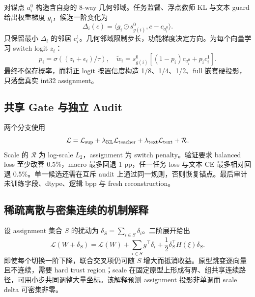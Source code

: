 对锚点 $a_i^0$ 构造含自身的 8-way 几何邻域。任务监督、浮点教师 KL 与文本 guard 给出权重梯度 $g_i$，候选一阶变化为
\begin{equation}
\Delta_i(c)=\langle g_i\odot s_{g(i)}^0,c-c_{a_i^0}\rangle.
\end{equation}
只保留最小 $\Delta_i$ 的邻居 $c_i^1$。几何邻域限制步长，功能梯度决定方向。为每个向量学习 switch logit $z_i$：
\begin{equation}
p_i=\sigma((z_i+\epsilon_i)/\tau),\quad
\tilde w_i=s_{g(i)}^0[(1-p_i)c_{a_i^0}+p_i c_i^1].
\end{equation}
最终不保存概率，而将正 logit 按置信度构造 1/8、1/4、1/2、full 嵌套硬投影，只落盘真实 int32 assignment。

\subsection{共享 Gate 与独立 Audit}

两个分支使用
\begin{equation}
\mathcal L=\mathcal L_{\rm sup}+\lambda_{\rm KL}\mathcal L_{\rm teacher}
+\lambda_{\rm text}\mathcal L_{\rm text}+\mathcal R.
\end{equation}
Scale 的 $\mathcal R$ 为 log-scale $L_2$，assignment 为 switch penalty。验证要求 balanced loss 至少改善 0.5\%，macro 最多回退 1 pp，任一任务 loss 与文本 CE 最多相对回退 0.5\%。单一候选还需在互斥 audit 上通过同一规则，否则恢复锚点。最后审计未训练字段、dtype、逻辑 bpp 与 fresh reconstruction。

\subsection{稀疏离散与密集连续的机制解释}

设 assignment 集合 $S$ 的扰动为 $\delta_S=\sum_{i\in S}\delta_i$。二阶展开给出
\begin{equation}
\mathcal L(W+\delta_S)=\mathcal L(W)+\sum_{i\in S}g^\top\delta_i+
\frac12\delta_S^\top H(\xi)\delta_S.
\end{equation}
即使每个切换一阶下降，联合交叉项仍可随 $S$ 增大而抵消收益。原型跳变逐向量且不连续，需要 hard trust region；scale 在固定原型上形成有界、组共享连续路径，可用小步共同调整大量坐标。该解释预测 assignment 投影非单调而 scale delta 可密集非零。
